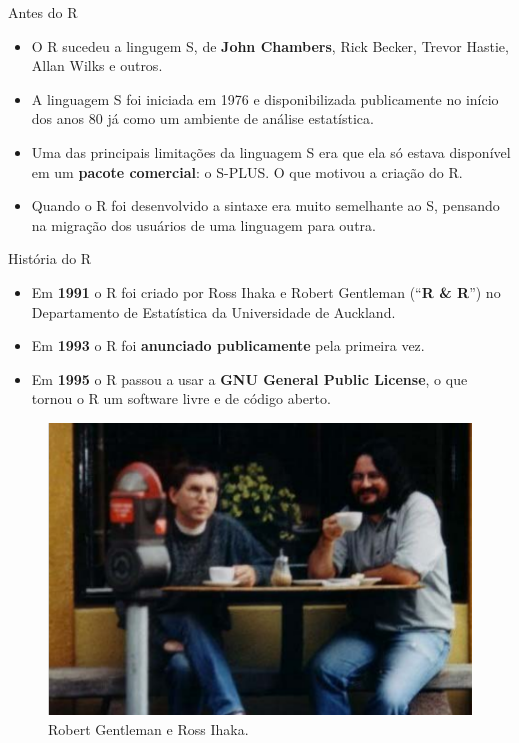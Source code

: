 \documentclass[
  ignorenonframetext,
  serif,
  professionalfont,
  usenames,
  dvipsnames,
  aspectratio = 169]{beamer}
\def\beginAHalfColumn{\begin{minipage}{0.49\textwidth}}%
\def\endColumns{\end{minipage}}%
\begin{document}
\begin{frame}{Antes do R}
\protect\hypertarget{antes-do-r}{}
\begin{itemize}
\item
  O R sucedeu a lingugem S, de \textbf{John Chambers}, Rick Becker,
  Trevor Hastie, Allan Wilks e outros.
\item
  A linguagem S foi iniciada em 1976 e disponibilizada publicamente no
  início dos anos 80 já como um ambiente de análise estatística.
\item
  Uma das principais limitações da linguagem S era que ela só estava
  disponível em um \textbf{pacote comercial}: o S-PLUS. O que motivou a
  criação do R.
\item
  Quando o R foi desenvolvido a sintaxe era muito semelhante ao S,
  pensando na migração dos usuários de uma linguagem para outra.
\end{itemize}
\end{frame}

\begin{frame}{História do R}
\protect\hypertarget{histuxf3ria-do-r}{}
\beginAHalfColumn

\begin{itemize}
\item
  Em \textbf{1991} o R foi criado por Ross Ihaka e Robert Gentleman
  (``\textbf{R \& R}'') no Departamento de Estatística da Universidade
  de Auckland.
\item
  Em \textbf{1993} o R foi \textbf{anunciado publicamente} pela primeira
  vez.
\item
  Em \textbf{1995} o R passou a usar a
  \textbf{GNU General Public License}, o que tornou o R um software
  livre e de código aberto.
\end{itemize}

\endColumns
\beginAHalfColumn

\begin{figure}

{\centering \includegraphics[width=0.8\linewidth]{./img/r&r} 

}

\caption{Robert Gentleman e Ross Ihaka.}\label{fig:unnamed-chunk-6}
\end{figure}

\endColumns
\end{frame}
\end{document}
